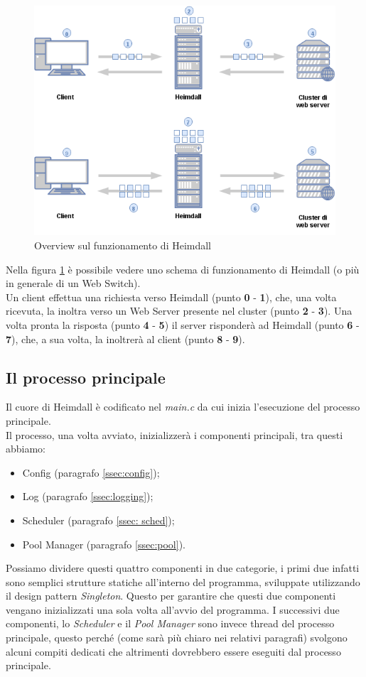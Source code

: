 \documentclass[italian]{tktltiki2}
\begin{document}
\begin{figure}
\centering
\includegraphics[width=\textwidth]{images/overview}
\caption{Overview sul funzionamento di Heimdall \label{fig: overview}}\end{figure}
Nella figura \ref{fig: overview} è possibile vedere uno schema di funzionamento di Heimdall (o più in generale di un Web Switch).
\\
Un client effettua una richiesta verso Heimdall (punto \textbf{0} - \textbf{1}), che, una volta ricevuta, la inoltra verso un Web Server presente nel cluster (punto \textbf{2} - \textbf{3}). Una volta pronta la risposta (punto \textbf{4} - \textbf{5}) il server risponderà ad Heimdall (punto \textbf{6} - \textbf{7}), che, a sua volta, la inoltrerà al client (punto \textbf{8} - \textbf{9}).

\subsection{Il processo principale}
\label{ssec:main_process}
Il cuore di Heimdall è codificato nel \emph{main.c} da cui inizia l'esecuzione del processo principale.
\\
Il processo, una volta avviato, inizializzerà i componenti principali, tra questi abbiamo:

\begin{itemize}
  \item Config (paragrafo \ref{ssec:config});
  \item Log (paragrafo \ref{ssec:logging});
  \item Scheduler (paragrafo \ref{ssec: sched});
  \item Pool Manager (paragrafo \ref{ssec:pool}).
\end{itemize}
Possiamo dividere questi quattro componenti in due categorie, i primi due infatti sono semplici strutture statiche all'interno del programma, sviluppate utilizzando il design pattern \emph{Singleton}. Questo per garantire che questi due componenti vengano inizializzati una sola volta all'avvio del programma. I successivi due componenti, lo \emph{Scheduler} e il \emph{Pool Manager} sono invece thread del processo principale, questo perché (come sarà più chiaro nei relativi paragrafi) svolgono alcuni compiti dedicati che altrimenti dovrebbero essere eseguiti dal processo principale.
\end{document}
